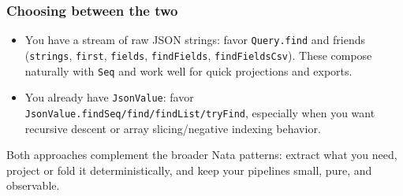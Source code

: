 \documentclass{article}
\begin{document}
\subsubsection{Choosing between the two}

\begin{itemize}
  \item You have a stream of raw JSON strings: favor \texttt{Query.find} and friends (\texttt{strings}, \texttt{first}, \texttt{fields}, \texttt{findFields}, \texttt{findFieldsCsv}). These compose naturally with \texttt{Seq} and work well for quick projections and exports.
  \item You already have \texttt{JsonValue}: favor \texttt{JsonValue.findSeq/find/findList/tryFind}, especially when you want recursive descent or array slicing/negative indexing behavior.
\end{itemize}

Both approaches complement the broader Nata patterns: extract what you need, project or fold it deterministically, and keep your pipelines small, pure, and observable.


\clearpage
\appendix
\end{document}
